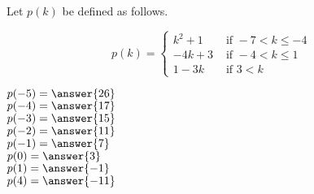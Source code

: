 \documentclass{ximera}
\author{Lee Wayand}
\begin{document}
\begin{exercise}




Let $p(k)$ be defined as follows.

\[
p(k) = 
\begin{cases}
  k^2 + 1 & \text{ if } -7 < k \leq -4 \\
  -4k + 3 & \text{ if } -4 < k \leq 1 \\
  1 - 3k & \text{ if } 3 < k
\end{cases}
\]



$p(-5) = \answer{26}$ \\


$p(-4) = \answer{17}$ \\


$p(-3) = \answer{15}$ \\


$p(-2) = \answer{11}$ \\


$p(-1) = \answer{7}$ \\


$p(0) = \answer{3}$ \\


$p(1) = \answer{-1}$ \\



$p(4) = \answer{-11}$ \\


\end{exercise}
\end{document}
